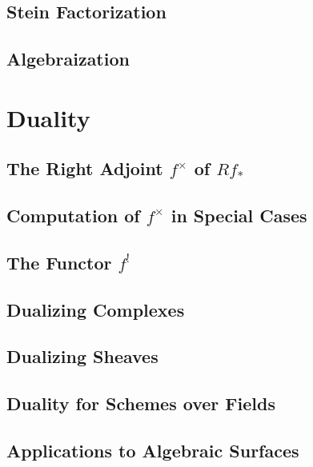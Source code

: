 \documentclass[11pt, a4paper]{article}
\begin{document}
\subsection{Stein Factorization}

\subsection{Algebraization}

\section{Duality}

\subsection{The Right Adjoint $f^\times$ of $Rf_*$}

\subsection{Computation of $f^\times$ in Special Cases}

\subsection{The Functor $f^!$}

\subsection{Dualizing Complexes}

\subsection{Dualizing Sheaves}

\subsection{Duality for Schemes over Fields}

\subsection{Applications to Algebraic Surfaces}

\end{document}
